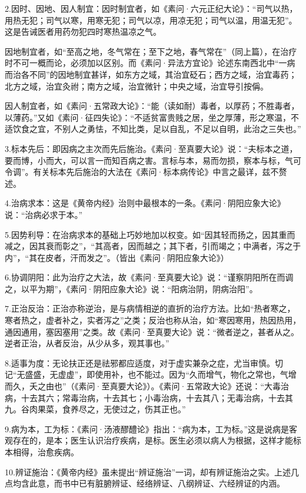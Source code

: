 \documentclass[12pt,UTF8]{ctexbook}
\begin{document}
2.因时、因地、因人制宜：因时制宜者，如《素问·六元正纪大论》：“司气以热，用热无犯；司气以寒，用寒无犯；司气以凉，用凉无犯；司气以温，用温无犯”。这是告诫医者用药勿犯四时寒热温凉之气。

因地制宜者，如“至高之地，冬气常在；至下之地，春气常在”（同上篇），在治疗时不可一概而论，必须加以区别。而《素问·异法方宜论》论述东南西北中“一病而治各不同”的因地制宜甚详，如东方之域，其治宜砭石；西方之域，治宜毒药；北方之域，治宜灸祔；南方之域，治宜微针；中央之域，治宜导引按偁。

因人制宜者，如《素问·五常政大论》：“能（读如耐）毒者，以厚药；不胜毒者，以薄药。”又如《素问·征四失论》：“不适贫富贵贱之居，坐之厚薄，形之寒温，不适饮食之宜，不别人之勇怯，不知比类，足以自乱，不足以自明，此治之三失也。”

3.标本先后：即因病之主次而先后施治。《素问·至真要大论》说：“夫标本之道，要而博，小而大，可以言一而知百病之害。言标与本，易而勿损，察本与标，气可令调”。有关标本先后施治的大法在《素问·标本病传论》中言之最详，兹不赘述。

4.治病求本：这是《黄帝内经》治则中最根本的一条。《素问·阴阳应象大论》说：“治病必求于本。”

5.因势利导：在治病求本的基础上巧妙地加以权变。如“因其轻而扬之，因其重而减之，因其衰而彰之”，“其高者，因而越之；其下者，引而竭之；中满者，泻之于内”，“其在皮者，汗而发之”。（皆出《素问·阴阳应象大论》）

6.协调阴阳：此为治疗之大法，故《素问·至真要大论》说：“谨察阴阳所在而调之，以平为期”，《素问·阴阳应象大论》说：“阳病治阴，阴病治阳”。

7.正治反治：正治亦称逆治，是与病情相逆的直折的治疗方法。比如“热者寒之，寒者热之，虚者补之，实者泻之”之类；反治也称从治，如“寒因寒用，热因热用，通因通用，塞因塞用”之类。故《素问·至真要大论》说：“微者逆之，甚者从之。逆者正治，从者反治，从少从多，观其事也。”

8.适事为度：无论扶正还是祛邪都应适度，对于虚实兼杂之症，尤当审慎。切记“无盛盛，无虚虚”，即使用补，也不能过。因为“久而增气，物化之常也，气增而久，夭之由也”（《素问·至真要大论》）。《素问·五常政大论》还说：“大毒治病，十去其六；常毒治病，十去其七；小毒治病，十去其八；无毒治病，十去其九。谷肉果菜，食养尽之，无使过之，伤其正也。”

9.病为本，工为标：《素问·汤液醪醴论》指出：“病为本，工为标。”这是说病是客观存在的，是本；医生认识治疗疾病，是标。医生必须以病人为根据，这样才能标本相得，治愈疾病。

10.辨证施治：《黄帝内经》虽未提出“辨证施治”一词，却有辨证施治之实。上述几点均含此意，而书中已有脏腑辨证、经络辨证、八纲辨证、六经辨证的内涵。
\end{document}
